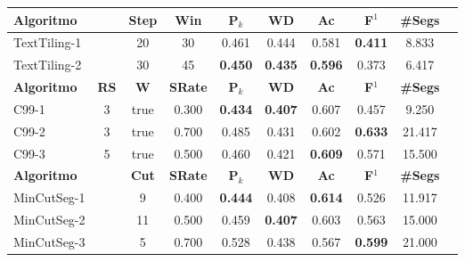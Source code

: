
\begin{table}[!h]
\small
	\centering
	\begin{tabular}{|l||c|c|c|c|c|c|c|c|c|} \hline

		\textbf{Algoritmo} && 
		\textbf{Step} &
		\textbf{Win} & 
		\textbf{P$_k$} & 
		\textbf{WD} & 
		\textbf{Ac} & 
		\textbf{F$^1$} &
		\textbf{\#Segs} \\	\hline

TextTiling-1 && 20 & 30 & 0.461 & 0.444 & 0.581 
		   & \cellcolor{gray!20} \textbf{0.411} & 8.833  \\ \hline 
TextTiling-2 && 30 & 45 & \cellcolor{gray!20} \textbf{0.450} & \cellcolor{gray!20} \textbf{0.435} & \cellcolor{gray!20} \textbf{0.596} 
		   & 0.373 & 6.417  \\ \hline 

\hline
		\textbf{Algoritmo} &
		\textbf{RS} &
		\textbf{W} & 
		\textbf{SRate}& 
		\textbf{P$_k$} & 
		\textbf{WD} & 
		\textbf{Ac} & 
		\textbf{F$^1$} &
		\textbf{\#Segs} \\	\hline

C99-1 & 3 & true  &0.300 &  \cellcolor{gray!20} \textbf{0.434} & \cellcolor{gray!20} \textbf{0.407} & 0.607 
	& 0.457 & 9.250  \\ \hline 
C99-2 & 3 & true  &0.700 &  0.485 & 0.431 & 0.602 
	& \cellcolor{gray!20} \textbf{0.633} & 21.417  \\ \hline 
C99-3 & 5 & true  &0.500 &  0.460 & 0.421 & \cellcolor{gray!20} \textbf{0.609} 
	& 0.571 & 15.500  \\ \hline 


\hline
		\textbf{Algoritmo} && 
		\textbf{Cut} & 
		\textbf{SRate} &
		\textbf{P$_k$} & 
		\textbf{WD} & 
		\textbf{Ac} & 
		\textbf{F$^1$} &
		\textbf{\#Segs} \\	\hline


MinCutSeg-1 && 9  & 0.400 & \cellcolor{gray!20} \textbf{0.444} & 0.408 & \cellcolor{gray!20} \textbf{0.614} 
		  & 0.526 & 11.917  \\ \hline 
MinCutSeg-2 && 11 & 0.500 & 0.459 & \cellcolor{gray!20} \textbf{0.407} & 0.603 
		  & 0.563 & 15.000  \\ \hline 
MinCutSeg-3 && 5  & 0.700 & 0.528 & 0.438 & 0.567 
		  & \cellcolor{gray!20} \textbf{0.599} & 21.000  \\ \hline 



\end{tabular}
\end{table}
